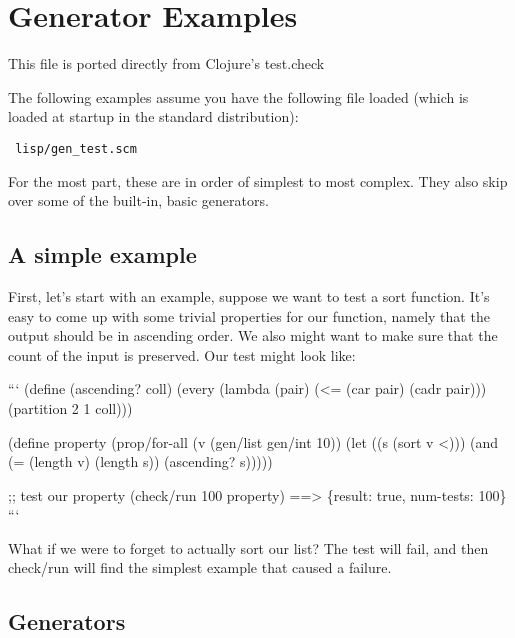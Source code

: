\documentclass{scrartcl}
\begin{document}
\section{Generator Examples}\hypertarget{generator-examples}{}\label{generator-examples}

This file is ported directly from Clojure's test.check

The following examples assume you have the following file loaded (which is loaded at startup in the standard distribution):

\texttt{
lisp/gen\_test.scm
}

For the most part, these are in order of simplest to most complex. They also
skip over some of the built-in, basic generators.

\subsection{A simple example}\hypertarget{a-simple-example}{}\label{a-simple-example}

First, let's start with an example, suppose we want to test a sort function.
It's easy to come up with some trivial properties for our function, namely that
the output should be in ascending order. We also might want to make sure that
the count of the input is preserved. Our test might look like:

```
(define (ascending? coll)
  (every (lambda (pair) (\textless{}= (car pair) (cadr pair)))
          (partition 2 1 coll)))

(define property
  (prop/for-all (v (gen/list gen/int 10))
    (let ((s (sort v \textless{})))
      (and (= (length v) (length s))
           (ascending? s)))))

;; test our property
(check/run 100 property)
==\textgreater{} \{result: true, num-tests: 100\}
```

What if we were to forget to actually sort our list? The test will fail, and
then check/run will find the simplest example that caused a failure.




\subsection{Generators}\hypertarget{generators}{}\label{generators}
\end{document}
